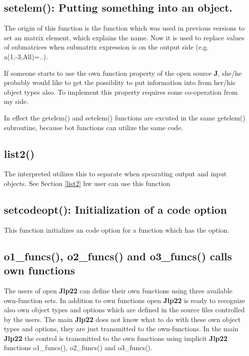 \subsection{\textcolor{VioletRed}{setelem}(): Putting something  into an object.}
\label{setelem}
The origin of this function is the function which was used in previous versions
to set an matrix element, which explains the name. Now it is used to replace values
of submatrices when submatrix expression is on the
output side (e.g. a(1,-3,All)=..).
\begin{note}
If someone starts to use the own function property of the open source \textbf{J}, she/he
probably would like to get the possiblity to put information into from her/his object types
also. To implement this property requires some co-operation from my side.
\end{note}
\begin{note}
In effect the \textcolor{VioletRed}{getelem}() and \textcolor{VioletRed}{setelem}() functions are excuted in the same
\textcolor{VioletRed}{getelem}() subroutine, because bot functions can utilize the same code.
\end{note}
\subsection{\textcolor{VioletRed}{list2}()}
\label{list20}
The interpreted utilizes this to separate when spearating output and input objects.
See Section \ref{list2} hw user can use this function
\subsection{\textcolor{VioletRed}{setcodeopt}(): Initialization of a code option}
\label{setcode}
This function initializes an code option for a function which has the option.
\subsection{\textcolor{VioletRed}{o1\_funcs}(), \textcolor{VioletRed}{o2\_funcs}() and \textcolor{VioletRed}{o3\_funcs}() calls own functions}
\label{own}
The users of open \textbf{Jlp22} can define their own functions using three
available own-function sets. In addition to own functions open \textbf{Jlp22} is ready to
recognize also own object types and options which are defined in the source files
controlled by the users. The main \textbf{Jlp22} does not know what to do with these own
object types and options, they are just transmitted to the own-functions.
In the main \textbf{Jlp22} the control is transmitted to the own functions using implicit
\textbf{Jlp22} functions \textcolor{VioletRed}{o1\_funcs}(), \textcolor{VioletRed}{o2\_funcs}() and \textcolor{VioletRed}{o3\_funcs}().
